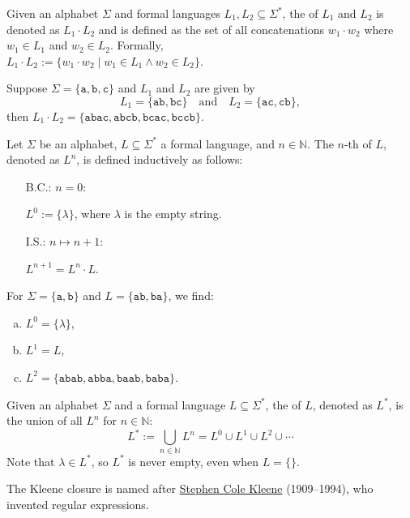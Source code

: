 \begin{Definition}
  Given an alphabet $ \Sigma $ and formal languages $ L_1, L_2 \subseteq \Sigma^* $, the
   of $ L_1 $ and $ L_2 $ is denoted as $ L_1 \cdot L_2 $ and
  is defined as the set of all concatenations $ w_1 \cdot w_2 $ where $ w_1 \in L_1 $ and $ w_2 \in L_2
  $. Formally,  
\\[0.2cm]
\hspace*{1.3cm}
$ L_1 \cdot L_2 := \{ w_1 \cdot w_2 \mid w_1 \in L_1 \land w_2 \in L_2 \}$. \eox 
\end{Definition}

\exampleEng
Suppose $ \Sigma = \{ \texttt{a}, \texttt{b}, \texttt{c} \} $ and $ L_1 $ and $ L_2 $ are given by
\[
L_1 = \{ \texttt{ab}, \texttt{bc} \} \quad \text{and} \quad L_2 = \{ \texttt{ac}, \texttt{cb} \},
\]
then $ L_1 \cdot L_2 = \{ \texttt{abac}, \texttt{abcb}, \texttt{bcac}, \texttt{bccb} \} $. \eox


\begin{Definition}
Let $ \Sigma $ be an alphabet, $ L \subseteq \Sigma^* $ a formal language, and $ n \in \mathbb{N} $. The $ n $-th  of $ L $, denoted as $ L^n $, is defined inductively as follows:
\begin{enumerate}
\item[B.C.:] $ n = 0 $:

             $ L^0 := \{ \lambda \} $, \quad where $ \lambda $ is the empty string.
\item[I.S.:] $ n \mapsto n + 1 $:
             
             $ L^{n+1} = L^n \cdot L $. \eox
\end{enumerate}
\end{Definition}

\exampleEng
For $ \Sigma = \{ \texttt{a}, \texttt{b} \} $ and $ L = \{ \texttt{ab}, \texttt{ba} \} $, we find:
\begin{enumerate}[(a)]
\item $ L^0 = \{ \lambda \} $,
\item $ L^1 = L $,
\item $ L^2 = \{ \texttt{abab}, \texttt{abba}, \texttt{baab}, \texttt{baba} \} $. \eox
\end{enumerate}

\begin{Definition}
  Given an alphabet $ \Sigma $ and a formal language $ L \subseteq \Sigma^* $, the  of $ L $, denoted as $ L^* $, is the union of all $ L^n $ for $ n \in \mathbb{N} $:
  \[
  L^* := \bigcup_{n \in \mathbb{N}} L^n = L^0 \cup L^1 \cup L^2 \cup \cdots
  \]
  Note that $ \lambda \in L^* $, so $ L^* $ is never empty, even when $ L = \{\} $.

  The Kleene closure is named after \href{https://en.wikipedia.org/wiki/Stephen_Cole_Kleene}{Stephen Cole Kleene}
  (1909--1994), who invented regular expressions.
  \eox
\end{Definition}




